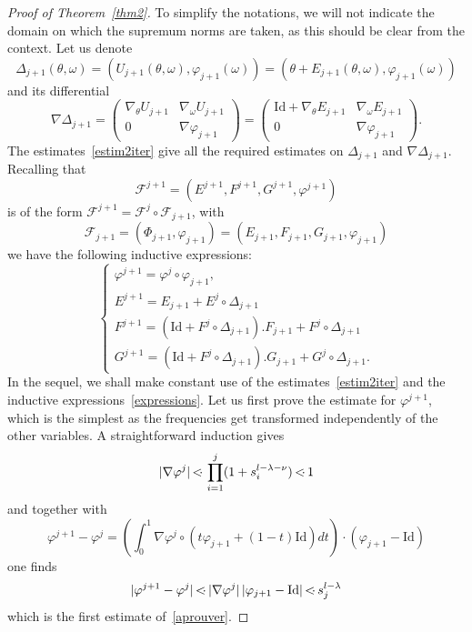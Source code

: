 \documentclass[JEP,XML,SOM,Unicode]{cedram}
\let\mathcal\mathscr
\numberwithin{equation}{section}
\theoremstyle{plain}
\theoremstyle{definition}
\newcommand\MP{\,{<\hspace{-.5em}\cdot}\,}
\begin{document}
\begin{proof}[Proof of Theorem~\ref{thm2}]
To simplify the notations, we will not indicate the domain on which the supremum norms are taken, as this should be clear from the context. Let us denote
\[ \Delta_{j+1}(\theta,\omega)=(U_{j+1}(\theta,\omega),\varphi_{j+1}(\omega))=(\theta+E_{j+1}(\theta,\omega),\varphi_{j+1}(\omega)) \]
and its differential
\[ \nabla \Delta_{j+1}=
\begin{pmatrix}
\nabla_\theta U_{j+1} & \nabla_\omega U_{j+1} \\
0 & \nabla \varphi_{j+1}
\end{pmatrix}
=
\begin{pmatrix}
\mathrm{Id}+\nabla_\theta E_{j+1} & \nabla_\omega E_{j+1} \\
0 & \nabla \varphi_{j+1}
\end{pmatrix}.
\]
The estimates~\eqref{estim2iter} give all the required estimates on $\Delta_{j+1}$ and $\nabla \Delta_{j+1}$. Recalling that
\[ \mathcal{F}^{j+1}=(E^{j+1},F^{j+1},G^{j+1},\varphi^{j+1}) \]
is of the form $\mathcal{F}^{j+1}=\mathcal{F}^{j} \circ \mathcal{F}_{j+1}$, with
\[ \mathcal{F}_{j+1}=(\Phi_{j+1},\varphi_{j+1})=(E_{j+1},F_{j+1},G_{j+1},\varphi_{j+1}) \]
we have the following inductive expressions:
\begin{equation}\label{expressions}
\begin{cases}
\varphi^{j+1}=\varphi^j \circ \varphi_{j+1}, \\
E^{j+1}=E_{j+1}+E^j \circ \Delta_{j+1} \\
F^{j+1}=(\mathrm{Id}+F^j \circ \Delta_{j+1}).F_{j+1}+F^j\circ \Delta_{j+1} \\
G^{j+1}=(\mathrm{Id}+F^j \circ \Delta_{j+1}).G_{j+1}+G^j\circ \Delta_{j+1}.
\end{cases}
\end{equation}
In the sequel, we shall make constant use of the estimates~\eqref{estim2iter} and the inductive expressions~\eqref{expressions}. Let us first prove the estimate for $\varphi^{j+1}$, which is the simplest as the frequencies get transformed independently of the other variables. A straightforward induction gives
\[ |\nabla \varphi^{j}| \MP \prod_{i=1}^{j}(1+s_i^{l-\lambda-\nu}) \MP 1 \]
and together with
\[ \varphi^{j+1}-\varphi^{j}=\left(\int_0^1\nabla \varphi^j \circ (t \varphi_{j+1}+(1-t)\mathrm{Id})dt\right)\cdot (\varphi_{j+1}-\mathrm{Id}) \]
one finds
\[ |\varphi^{j+1}-\varphi^{j}| \MP |\nabla \varphi^j|\, |\varphi_{j+1}-\mathrm{Id}|\MP s_j^{l-\lambda} \]
which is the first estimate of~\eqref{aprouver}.


\end{proof}
\end{document}
